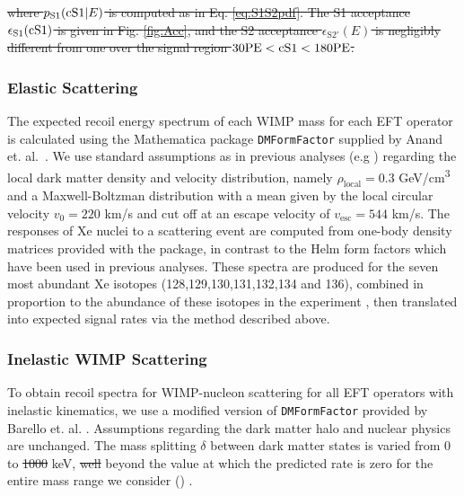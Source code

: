 %

\sout{
where $p_\mathrm{S1}(\mathrm{\mathrm{cS1}}|E)$ is computed as in Eq. \ref{eq:S1S2pdf}. The S1 acceptance $\epsilon_\mathrm{S1}(\mathrm{cS1})$ is given in Fig. \ref{fig:Acc}, and the S2 acceptance $\epsilon_\mathrm{S2'}(E)$ is negligibly different from one over the signal region $30 \mathrm{PE} < \mathrm{cS1} < 180 \mathrm{PE}$.
}
\subsubsection{Elastic Scattering}
\label{subsubsec:Elastic}

The expected recoil energy spectrum of each WIMP mass for each EFT operator is calculated using the Mathematica package \texttt{DMFormFactor} supplied by Anand et. al.~\cite{Fitzpatrick:MathTools,Anand:MathTools}. We use standard assumptions as in previous analyses (e.g \cite{xe100_run_combination}) regarding the local dark matter density and velocity distribution, namely $\rho_\mathrm{local} = 0.3$ GeV/cm\textsuperscript{3} and a Maxwell-Boltzman distribution with a mean given by the local circular velocity $v_0 = 220$ km/s and cut off at an escape velocity of $v_\mathrm{esc} = 544$ km/s. The responses of Xe nuclei to a scattering event are computed from one-body density matrices provided with the package, in contrast to the Helm form factors which have been used in previous analyses. These spectra are produced for the seven most abundant Xe isotopes (128,129,130,131,132,134 and 136), combined in proportion to the abundance of these isotopes in the experiment \cite{xe100_run10_sd}, then translated into expected signal rates via the method described above.

\subsubsection{Inelastic WIMP Scattering}
\label{subsubsec:Inelastic}
To obtain recoil spectra for WIMP-nucleon scattering for all EFT operators with inelastic kinematics, we use a modified version of \texttt{DMFormFactor} provided by Barello et. al. \cite{InelasticMath}. Assumptions regarding the dark matter halo and nuclear physics are unchanged. The mass splitting $\delta$ between dark matter states is varied from 0 to \sout{1000}  keV, \sout{well} beyond the value at which the predicted rate is zero for the entire mass range we consider () .
